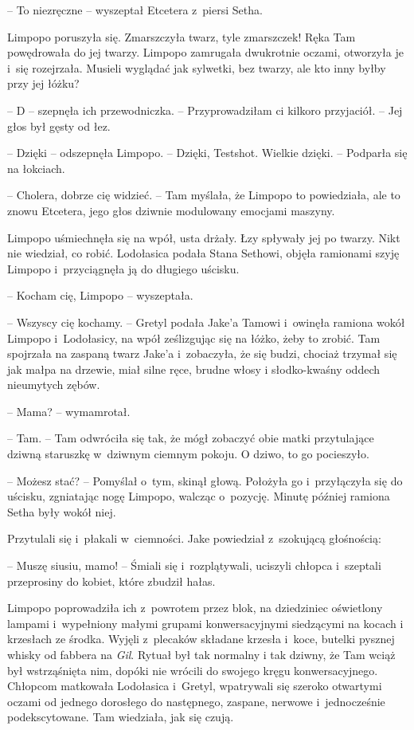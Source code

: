 \documentclass[oneside,polish,11pt,sfheadings]{mwbk}
\begin{document}
-- To niezręczne -- wyszeptał Etcetera z~piersi Setha.

Limpopo poruszyła
się. Zmarszczyła twarz, tyle zmarszczek! Ręka Tam powędrowała do jej
twarzy. Limpopo zamrugała dwukrotnie oczami, otworzyła je i~się
rozejrzała. Musieli wyglądać jak sylwetki, bez twarzy, ale kto inny
byłby przy jej łóżku?

-- D -- szepnęła ich przewodniczka. -- Przyprowadziłam ci kilkoro przyjaciół. -- Jej głos był gęsty od łez.

-- Dzięki -- odszepnęła Limpopo. -- Dzięki, Testshot. Wielkie dzięki. -- Podparła się na łokciach.

-- Cholera, dobrze cię widzieć. -- Tam myślała, że Limpopo to powiedziała,
ale to znowu Etcetera, jego głos dziwnie modulowany emocjami maszyny.

Limpopo uśmiechnęła się na wpół, usta drżały. Łzy spływały jej po
twarzy. Nikt nie wiedział, co robić. Lodołasica podała Stana Sethowi,
objęła ramionami szyję Limpopo i~przyciągnęła ją do długiego uścisku. 

-- Kocham cię, Limpopo -- wyszeptała.

-- Wszyscy cię kochamy. -- Gretyl podała Jake'a Tamowi i~owinęła ramiona
wokół Limpopo i~Lodołasicy, na wpół ześlizgując się na łóżko, żeby to
zrobić. Tam spojrzała na zaspaną twarz Jake'a i~zobaczyła, że się budzi,
chociaż trzymał się jak małpa na drzewie, miał silne ręce, brudne włosy
i słodko-kwaśny oddech nieumytych zębów. 

-- Mama? -- wymamrotał.

-- Tam. -- Tam odwróciła się tak, że mógł zobaczyć obie matki przytulające
dziwną staruszkę w~dziwnym ciemnym pokoju. O dziwo, to go pocieszyło. 

-- Możesz stać? -- Pomyślał o~tym, skinął głową. Położyła go i~przyłączyła
się do uścisku, zgniatając nogę Limpopo, walcząc o~pozycję. Minutę
później ramiona Setha były wokół niej.

Przytulali się i~płakali w~ciemności. Jake powiedział z~szokującą
głośnością: 

-- Muszę siusiu, mamo! -- Śmiali się i~rozplątywali, uciszyli
chłopca i~szeptali przeprosiny do kobiet, które zbudził hałas.

Limpopo poprowadziła ich z~powrotem przez blok, na dziedziniec oświetlony
lampami i~wypełniony małymi grupami konwersacyjnymi siedzącymi na kocach
i krzesłach ze środka. Wyjęli z~plecaków składane krzesła i~koce,
butelki pysznej whisky od fabbera na \textit{Gil}. Rytuał był tak normalny
i tak dziwny, że Tam wciąż był wstrząśnięta nim, dopóki nie wrócili do
swojego kręgu konwersacyjnego. Chłopcom matkowała Lodołasica i~Gretyl,
wpatrywali się szeroko otwartymi oczami od jednego dorosłego do
następnego, zaspane, nerwowe i~jednocześnie podekscytowane. Tam
wiedziała, jak się czują.
\end{document}

